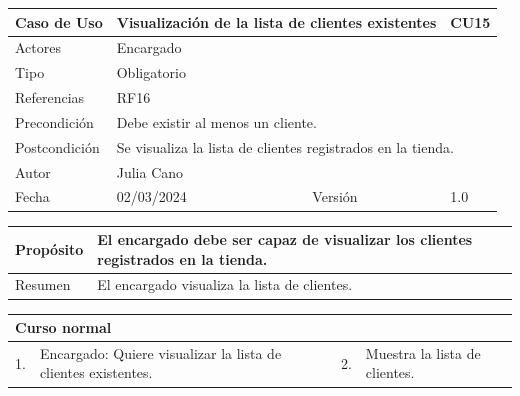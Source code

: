 \begin{table}[H]
	\centering
	\begin{tabular}{| m{} | m{} | m{} | m{}|}
		\hline
		\rowcolor{grayshade} Caso de Uso & \multicolumn{2}{|m{0.43\textwidth}|}{Visualización de la lista de clientes existentes} &  CU15\\ 
		\hline
		Actores & \multicolumn{3}{l|}{Encargado} \\ 
		\hline
		Tipo & \multicolumn{3}{l|}{Obligatorio} \\ 
		\hline
		Referencias & \multicolumn{3}{l|}{RF16} \\ 
		\hline
		Precondición & \multicolumn{3}{m{0.67\textwidth}|}{Debe existir al menos un cliente.} \\ 
		\hline
		Postcondición & \multicolumn{3}{m{0.67\textwidth}|}{Se visualiza la lista de clientes registrados en la tienda.} \\ 
		\hline
		Autor & \multicolumn{3}{l|}{Julia Cano} \\ 
		\hline
		Fecha & 02/03/2024 & Versión & 1.0 \\
		\hline
	\end{tabular}
\end{table}

\begin{table}[H]
	\centering
	\begin{tabular}{| m{} | m{} | m{} | m{} |}
		\hline
		Propósito & \multicolumn{3}{m{0.67\textwidth}|}{El encargado debe ser capaz de visualizar los clientes registrados en la tienda.}  \\ 
		\hline
		Resumen & \multicolumn{3}{m{0.67\textwidth}|}{El encargado visualiza la lista de clientes.} \\ 
		\hline
	\end{tabular}
\end{table}


\begin{table}[H]
	\centering
	\begin{tabular}{| m{} | m{} | m{} | m{} |}
		\hline
		\multicolumn{4}{|m{0.9\textwidth}|}{Curso normal}     \\ 
		\hline
		1. & Encargado: Quiere visualizar la lista de clientes existentes. & 2. &  Muestra la lista de clientes.  \\ 
		\hline
	\end{tabular}
\end{table}

